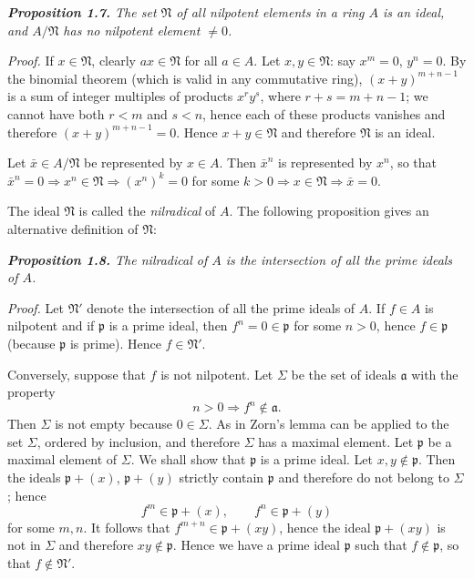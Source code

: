 \medskip
\noindent\textit{\textbf{Proposition 1.7.} The set $\mathfrak N$ of all nilpotent elements in a ring $A$ is an ideal,
and $A/\mathfrak N$ has no nilpotent element $\ne0$.}

\noindent\emph{Proof.}  If $x\in\mathfrak N$, clearly $ax\in\mathfrak N$ for all $a\in A$.  Let $x,y\in\mathfrak N$: say $x^m=0$, $y^n=0$.
By the binomial theorem (which is valid in any commutative ring), $(x+y)^{m+n-1}$
is a sum of integer multiples of products $x^ry^s$, where $r+s=m+n-1$; we
cannot have both $r<m$ and $s<n$, hence each of these products vanishes and
therefore $(x+y)^{m+n-1}=0$.  Hence $x+y\in\mathfrak N$ and therefore $\mathfrak N$ is an ideal.

Let $\bar{x}\in A/\mathfrak N$ be represented by $x\in A$.  Then $\bar{x}^n$ is represented by $x^n$, so that
$\bar{x}^n=0\Rightarrow x^n\in\mathfrak N\Rightarrow(x^n)^k=0$ for some $k>0\Rightarrow x\in\mathfrak N\Rightarrow\bar{x}=0$.\proofbox

The ideal $\mathfrak N$ is called the \emph{nilradical} of $A$.  The following proposition gives an
alternative definition of $\mathfrak N$:

\medskip
\noindent\textit{\textbf{Proposition 1.8.} The nilradical of $A$ is the intersection of all the prime ideals
of $A$.}

\noindent\emph{Proof.}  Let $\mathfrak N'$ denote the intersection of all the prime ideals of $A$.  If $f\in A$ is
nilpotent and if $\mathfrak p$ is a prime ideal, then $f^n=0\in\mathfrak p$ for some $n>0$, hence
$f\in\mathfrak p$ (because $\mathfrak p$ is prime).  Hence $f\in\mathfrak N'$.

Conversely, suppose that $f$ is not nilpotent.  Let $\Sigma$ be the set of ideals $\mathfrak a$
with the property
\[
n>0\Rightarrow f^n\notin\mathfrak a.
\]
Then $\Sigma$ is not empty because $0\in\Sigma$.  As in  Zorn's lemma can be applied
to the set $\Sigma$, ordered by inclusion, and therefore $\Sigma$ has a maximal element.  Let
$\mathfrak p$ be a maximal element of $\Sigma$.  We shall show that $\mathfrak p$ is a prime ideal.  Let
$x,y\notin\mathfrak p$.  Then the ideals $\mathfrak p+(x)$, $\mathfrak p+(y)$ strictly contain $\mathfrak p$ and therefore do
not belong to $\Sigma$; hence
\[
f^m\in\mathfrak p+(x),\qquad f^n\in\mathfrak p+(y)
\]
for some $m,n$.  It follows that $f^{m+n}\in\mathfrak p+(xy)$, hence the ideal $\mathfrak p+(xy)$ is not
in $\Sigma$ and therefore $xy\notin\mathfrak p$.  Hence we have a prime ideal $\mathfrak p$ such that $f\notin\mathfrak p$, so that
$f\notin\mathfrak N'$.\proofbox


